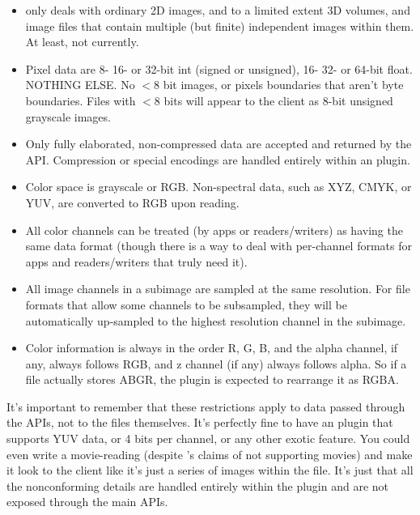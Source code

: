 \begin{itemize}
  \item \product only deals with ordinary 2D images, and to a limited
    extent 3D volumes, and image files that contain multiple (but
    finite) independent images within them.    At least, not currently.

  \item Pixel data are 8- 16- or 32-bit int (signed or unsigned), 16-
    32- or 64-bit float.  NOTHING ELSE.  No $<8$ bit images, or pixels
    boundaries that aren't byte boundaries.  Files with $<8$ bits will
    appear to the client as 8-bit unsigned grayscale images.

  \item Only fully elaborated, non-compressed data are accepted
    and returned by the API.  Compression or special encodings are
    handled entirely within an \product plugin.

  \item Color space is grayscale or RGB.  Non-spectral data, such as
    XYZ, CMYK, or YUV, are converted to RGB upon reading.\

  \item All color channels can be treated (by apps or readers/writers)
    as having the same data format (though there is a way to deal with
    per-channel formats for apps and readers/writers that truly need
    it).

  \item All image channels in a subimage are sampled at the same
    resolution.  For file formats that allow some channels to be
    subsampled, they will be automatically up-sampled to the highest
    resolution channel in the subimage.

  \item Color information is always in the order R, G, B, and the alpha
    channel, if any, always follows RGB, and z channel (if any) always
    follows alpha.  So if a file actually stores ABGR, the plugin is
    expected to rearrange it as RGBA.

\end{itemize}

It's important to remember that these restrictions apply to data passed
through the APIs, not to the files themselves.  It's perfectly fine to
have an \product plugin that supports YUV data, or 4 bits per channel, or
any other exotic feature.  You could even write a movie-reading
\ImageInput (despite \product's claims of not supporting movies) and
make it look to the client like it's just a series of images within the
file.  It's just that all the nonconforming details are handled entirely
within the \product plugin and are not exposed through the main \product
APIs.


